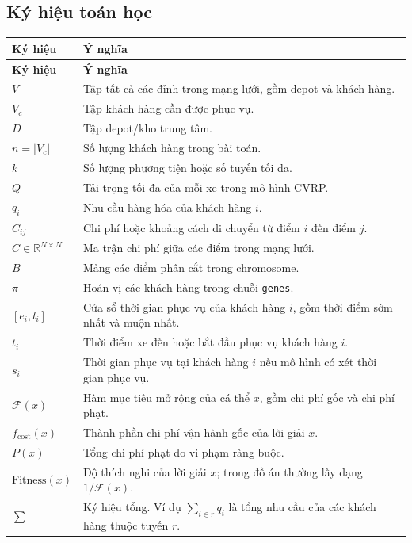 \documentclass[12pt,a4paper]{article}
\numberwithin{figure}{subsection}
\numberwithin{table}{subsection}
\begin{document}
\subsection*{Ký hiệu toán học}
\renewcommand{\arraystretch}{1.22}
\begin{longtable}{|p{3.2cm}|p{10.8cm}|}
\hline
\textbf{Ký hiệu} & \textbf{Ý nghĩa} \\
\hline
\endfirsthead
\hline
\textbf{Ký hiệu} & \textbf{Ý nghĩa} \\
\hline
\endhead
$V$ & Tập tất cả các đỉnh trong mạng lưới, gồm depot và khách hàng. \\
\hline
$V_c$ & Tập khách hàng cần được phục vụ. \\
\hline
$D$ & Tập depot/kho trung tâm. \\
\hline
$n = |V_c|$ & Số lượng khách hàng trong bài toán. \\
\hline
$k$ & Số lượng phương tiện hoặc số tuyến tối đa. \\
\hline
$Q$ & Tải trọng tối đa của mỗi xe trong mô hình CVRP. \\
\hline
$q_i$ & Nhu cầu hàng hóa của khách hàng $i$. \\
\hline
$C_{ij}$ & Chi phí hoặc khoảng cách di chuyển từ điểm $i$ đến điểm $j$. \\
\hline
$C \in \mathbb{R}^{N \times N}$ & Ma trận chi phí giữa các điểm trong mạng lưới. \\
\hline
$B$ & Mảng các điểm phân cắt trong chromosome. \\
\hline
$\pi$ & Hoán vị các khách hàng trong chuỗi \texttt{genes}. \\
\hline
$[e_i,l_i]$ & Cửa sổ thời gian phục vụ của khách hàng $i$, gồm thời điểm sớm nhất và muộn nhất. \\
\hline
$t_i$ & Thời điểm xe đến hoặc bắt đầu phục vụ khách hàng $i$. \\
\hline
$s_i$ & Thời gian phục vụ tại khách hàng $i$ nếu mô hình có xét thời gian phục vụ. \\
\hline
$\mathcal{F}(x)$ & Hàm mục tiêu mở rộng của cá thể $x$, gồm chi phí gốc và chi phí phạt. \\
\hline
$f_{\text{cost}}(x)$ & Thành phần chi phí vận hành gốc của lời giải $x$. \\
\hline
$P(x)$ & Tổng chi phí phạt do vi phạm ràng buộc. \\
\hline
$\text{Fitness}(x)$ & Độ thích nghi của lời giải $x$; trong đồ án thường lấy dạng $1/\mathcal{F}(x)$. \\
\hline
$\sum$ & Ký hiệu tổng. Ví dụ $\sum_{i \in r} q_i$ là tổng nhu cầu của các khách hàng thuộc tuyến $r$. \\

\end{longtable}
\end{document}
